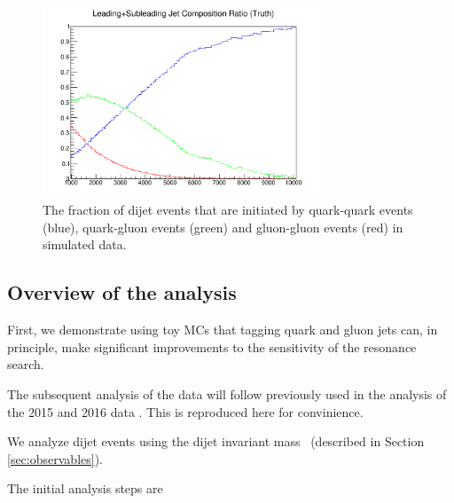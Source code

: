 \begin{figure}[htb]
 \centering
\includegraphics[width=0.75\textwidth]{figures/introduction/truthCompositionRatio.pdf}
\caption{The fraction of dijet events that are initiated by quark-quark events (blue), quark-gluon 
events (green) and gluon-gluon events (red) in simulated data.  \label{fig:quarkgluonfraction}}
\end{figure}

\subsection{Overview of the analysis}
\label{sec:overview}

First, we demonstrate using toy MCs that tagging quark and gluon jets can, in principle, make significant 
improvements to the sensitivity of the resonance search.

The subsequent analysis of the data will follow previously used in the analysis of the 2015 and 2016 data 
\cite{EXOT-2016-21,Bauce:2226443}. This is reproduced here for convinience. 


We analyze dijet events using the dijet invariant mass \mjj\  (described in Section \ref{sec:observables}).

The initial analysis steps are

